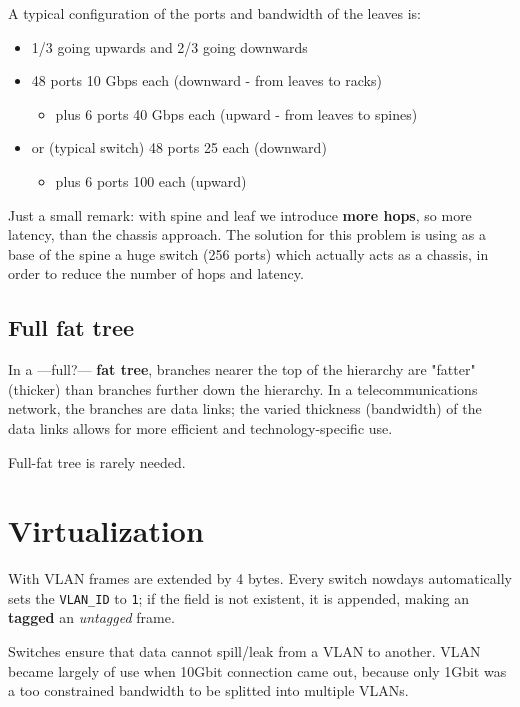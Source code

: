 A typical configuration of the ports and bandwidth of the leaves is:
\begin{itemize}
   \item 1/3 going upwards and 2/3 going downwards
   \item 48 ports 10 Gbps each (downward - from leaves to racks)
   \begin{itemize}
      \item plus 6 ports 40 Gbps each (upward - from leaves to spines)
   \end{itemize}
   \item or (typical switch) 48 ports 25 each (downward)
   \begin{itemize}
      \item plus 6 ports 100 each (upward)
   \end{itemize}
\end{itemize}

Just a small remark: with spine and leaf we introduce \textbf{more hops}, so more latency, than the chassis approach. The solution for this problem is using as
a base of the spine a huge switch (256 ports) which actually acts as a
chassis, in order to reduce the number of hops and latency.


\subsection{Full fat tree}
In a ---full?--- \textbf{fat tree}, branches nearer the top of the hierarchy are "fatter" (thicker) than branches further down the hierarchy. In a telecommunications network, the branches are data links; the varied thickness (bandwidth) of the data links allows for more efficient and technology-specific use.

Full-fat tree is rarely needed.

\section{Virtualization}

With VLAN frames are extended by 4 bytes. Every switch nowdays automatically sets the \texttt{VLAN\_ID} to \texttt{1}; if the field is not existent, it is appended, making an \textbf{tagged} an \textit{untagged} frame.

Switches ensure that data cannot spill/leak from a VLAN to another.
VLAN became largely of use when 10Gbit connection came out, because only 1Gbit was a too constrained bandwidth to be splitted into multiple VLANs. 

